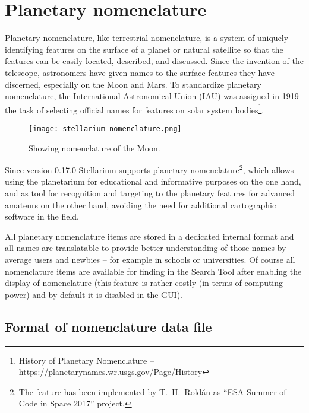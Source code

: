 
\chapter{Planetary nomenclature}
\label{ch:Nomenclature}

 Planetary nomenclature, like terrestrial nomenclature, is a system of uniquely identifying features on the surface of a planet or natural satellite so that the features can be easily located, described, and discussed. Since the invention of the telescope, astronomers have given names to the surface features they have discerned, especially on the Moon and Mars. To standardize planetary nomenclature, the International Astronomical Union (IAU) was assigned in 1919 the task of selecting official names for features on solar system bodies\footnote{History of Planetary Nomenclature -- \url{https://planetarynames.wr.usgs.gov/Page/History}}.

\begin{figure}[ht]
\centering\texttt{[image: stellarium-nomenclature.png]}
\caption{Showing nomenclature of the Moon.}
\label{fig:Nomenclature:Moon}
\end{figure}

Since version 0.17.0 Stellarium supports planetary nomenclature\footnote{The feature has been implemented by T.~H.~Roldán as ``ESA Summer of Code in Space 2017'' project.}, which allows using the planetarium for educational and informative purposes on the one hand, and as tool for recognition and targeting to the planetary features for advanced amateurs on the other hand, avoiding the need for additional cartographic software in the field. 

All planetary nomenclature items are stored in a dedicated internal format and all names are translatable to provide better understanding of those names by average users and newbies -- for example in schools or universities.  Of course all nomenclature items are available for finding in the Search Tool after enabling the display of nomenclature (this feature is rather costly (in terms of computing power) and by default it is disabled in the GUI).

\section{Format of nomenclature data file}
\label{sec:Nomenclature:format}

